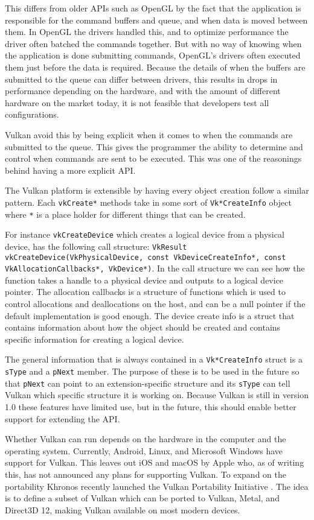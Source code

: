 This differs from older \glspl{API} such as OpenGL by the fact that the application is responsible for the command buffers and queue, and when data is moved between them.
In OpenGL the drivers handled this, and to optimize performance the driver often batched the commands together.
But with no way of knowing when the application is done submitting commands, OpenGL's drivers often executed them just before the data is required.
Because the details of when the buffers are submitted to the queue can differ between drivers, this results in drops in performance depending on the hardware, and with the amount of different hardware on the market today, it is not feasible that developers test all configurations.

Vulkan avoid this by being explicit when it comes to when the commands are submitted to the queue.
This gives the programmer the ability to determine and control when commands are sent to be executed.
This was one of the reasonings behind having a more explicit \gls{API}.

The Vulkan platform is extensible by having every object creation follow a similar pattern.
Each \texttt{vkCreate*} methods take in some sort of \texttt{Vk*Create\-Info} object where \texttt{*} is a place holder for different things that can be created.

For instance \texttt{vkCreateDevice} which creates a logical device from a physical device, has the following call structure: \texttt{VkResult vkCreateDevice(VkPhysicalDevice, const VkDeviceCreateInfo*, const VkAllocationCallbacks*, VkDevice*)}.
In the call structure we can see how the function takes a handle to a physical device and outputs to a logical device pointer.
The allocation callbacks is a structure of functions which is used to control allocations and deallocations on the host, and can be a null pointer if the default implementation is good enough.
The device create info is a struct that contains information about how the object should be created and contains specific information for creating a logical device.

The general information that is always contained in a \texttt{Vk*CreateInfo} struct is a \texttt{sType} and a \texttt{pNext} member.
The purpose of these is to be used in the future so that \texttt{pNext} can point to an extension-specific structure and its \texttt{sType} can tell Vulkan which specific structure it is working on.
Because Vulkan is still in version 1.0 these features have limited use, but in the future, this should enable better support for extending the \gls{API}.

Whether Vulkan can run depends on the hardware in the computer and the operating system.
Currently, Android, Linux, and Microsoft Windows have support for Vulkan.
This leaves out iOS and macOS by Apple who, as of writing this, has not announced any plans for supporting Vulkan.
To expand on the portability Khronos recently launched the Vulkan Portability Initiative \cite{trevett2017khronos}.
The idea is to define a subset of Vulkan which can be ported to Vulkan, Metal, and Direct3D 12, making Vulkan available on most modern devices.